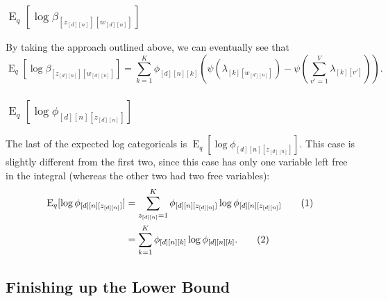 \documentclass[12pt]{article}
\newcommand\numberthis{\addtocounter{equation}{1}\tag{\theequation}}
\newcommand{\E}{\operatorname{E}}
\begin{document}
\subsubsection{$\E_{q}[\log \beta_{[z_{[d][n]}][w_{[d][n]}]}]$}

By taking the approach outlined above, we can eventually see that
\begin{equation}
    \E_{q}[\log \beta_{[z_{[d][n]}][w_{[d][n]}]}] =
    \sum_{k=1}^{K} \phi_{[d][n][k]}
    \left(\psi(\lambda_{[k][w_{[d][n]}]}) - \psi(\sum_{v'=1}^{V}
    \lambda_{[k][v']})\right).\label{eq:expectedlogbeta}
\end{equation}

\subsubsection{$\E_{q}[\log \phi_{[d][n][z_{[d][n]}]}]$}

The last of the expected log categoricals is $\E_{q}[\log
\phi_{[d][n][z_{[d][n]}]}]$.  This case is slightly different from the first
two, since this case has only one variable left free in the integral (whereas
the other two had two free variables):
\begin{align*}
    \E_{q}[\log \phi_{[d][n][z_{[d][n]}]}] &=
    \sum_{z_{[d][n]}=1}^{K} \phi_{[d][n][z_{[d][n]}]} \log
    \phi_{[d][n][z_{[d][n]}]}\numberthis \\
    &= \sum_{k=1}^{K} \phi_{[d][n][k]} \log
    \phi_{[d][n][k]}. \numberthis \label{eq:expectedlogphi}
\end{align*}

\subsection{Finishing up the Lower Bound}
\end{document}
